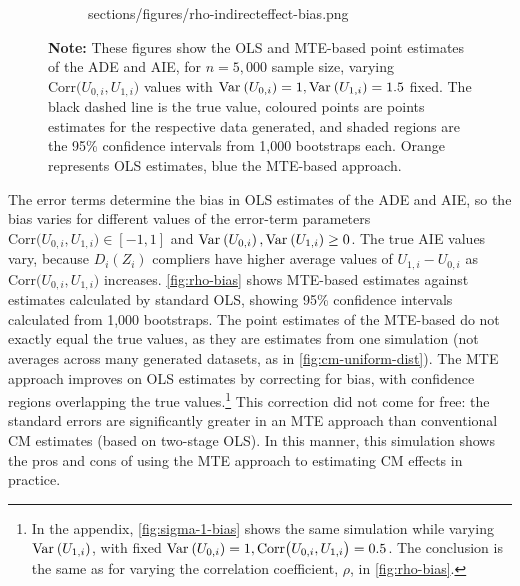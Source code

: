 \begin{figure}[h!]
\begin{subfigure}[c]{0.475\textwidth}
{            sections/figures/rho-indirecteffect-bias.png}
    \end{subfigure}
    \label{fig:rho-bias}
    \justify
    \footnotesize    
    \textbf{Note:}
    These figures show the OLS and MTE-based point estimates of the ADE and AIE, for $n = 5,000$ sample size, varying $\text{Corr}\big(U_{0,i}, U_{1,i}\big)$ values with $\text{Var}_{} \left( U_{0,i} \right) = 1, \text{Var}_{} \left( U_{1,i} \right) = 1.5$ fixed.
    The black dashed line is the true value, coloured points are points estimates for the respective data generated, and shaded regions are the 95\% confidence intervals from 1,000 bootstraps each.
    Orange represents OLS estimates, blue the MTE-based approach.
\end{figure}

The error terms determine the bias in OLS estimates of the ADE and AIE, so the bias varies for different values of the error-term parameters $\text{Corr}\big(U_{0,i}, U_{1,i}\big) \in [-1, 1]$ and $\text{Var}_{} \left( U_{0,i} \right), \text{Var}_{} \left( U_{1,i} \right) \geq 0$.
The true AIE values vary, because $D_i(Z_i)$ compliers have higher average values of $U_{1,i} - U_{0,i}$ as $\text{Corr}\big(U_{0,i}, U_{1,i}\big)$ increases.
\autoref{fig:rho-bias} shows MTE-based estimates against estimates calculated by standard OLS, showing 95\% confidence intervals calculated from 1,000 bootstraps.
The point estimates of the MTE-based do not exactly equal the true values, as they are estimates from one simulation (not averages across many generated datasets, as in \autoref{fig:cm-uniform-dist}).
The MTE approach improves on OLS estimates by correcting for bias, with confidence regions overlapping the true values.\footnote{
    In the appendix, \autoref{fig:sigma-1-bias} shows the same simulation while varying $\text{Var}_{} \left( U_{1,i} \right)$, with fixed $\text{Var}_{} \left( U_{0,i} \right) = 1, \text{Corr}\big(U_{0,i}, U_{1,i}\big) = 0.5$.
    The conclusion is the same as for varying the correlation coefficient, $\rho$, in \autoref{fig:rho-bias}.
}
This correction did not come for free: the standard errors are significantly greater in an MTE approach than conventional CM estimates (based on two-stage OLS).
In this manner, this simulation shows the pros and cons of using the MTE approach to estimating CM effects in practice.
